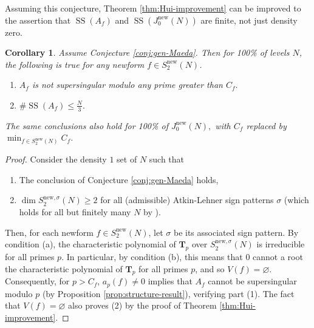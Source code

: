 \documentclass[11pt,letterpaper,reqno]{amsart}
\newtheorem{corollary}[theorem]{Corollary}
\theoremstyle{definition}
\numberwithin{equation}{section}
\numberwithin{figure}{section}
\numberwithin{table}{section}
\newcommand{\nw}{\mathrm{new}}
\begin{document}
Assuming this conjecture, Theorem \ref{thm:Hui-improvement} can be improved to the assertion that $\operatorname{SS}(A_f)$ and $\operatorname{SS}(J_0^\nw(N))$ are finite, not just density zero.

\begin{corollary}\label{cor:finiteness-assuming-Maeda}
    Assume Conjecture \ref{conj:gen-Maeda}. Then for 100\% of levels $N$, the following is true for any newform $f \in S_2^{\nw}(N)$.
    \begin{enumerate}
        \item $A_f$ is not supersingular modulo any prime greater than $C_f.$
        \item $\# \operatorname{SS}(A_f) \leq \frac{N}{3}.$
    \end{enumerate}
    The same conclusions also hold for 100\% of $J_0^\nw(N),$ with $C_f$ replaced by $\min_{f \in S_2^\nw(N)} C_f$.
\end{corollary}

\begin{proof}
    Consider the density $1$ set of $N$ such that
    \begin{enumerate}
        \item[(a)] The conclusion of Conjecture \ref{conj:gen-Maeda} holds,
        \item[(b)] $\dim S_2^{\nw, \sigma}(N) \geq 2$ for all (admissible) Atkin-Lehner sign patterns $\sigma$ (which holds for all but finitely many $N$ by \cite[Theorem 1.1]{RVWX26}).
    \end{enumerate}
    Then, for each newform $f \in S_2^\nw(N)$, let $\sigma$ be its associated sign pattern. By condition (a), the characteristic polynomial of $\mathbf{T}_p$ over $S_2^{\nw, \sigma}(N)$ is irreducible for all primes $p$. In particular, by condition (b), this means that $0$ cannot a root the characteristic polynomial of $\mathbf{T}_p$ for all primes $p$, and so $V(f)=\varnothing$. Consequently, for $p > C_f$, $a_p(f) \ne 0$ implies that $A_f$ cannot be supersingular modulo $p$ (by Proposition \ref{prop:structure-result}), verifying part (1). The fact that $V(f) = \varnothing$ also proves (2) by the proof of Theorem \ref{thm:Hui-improvement}.
\end{proof}


  
\end{document}

